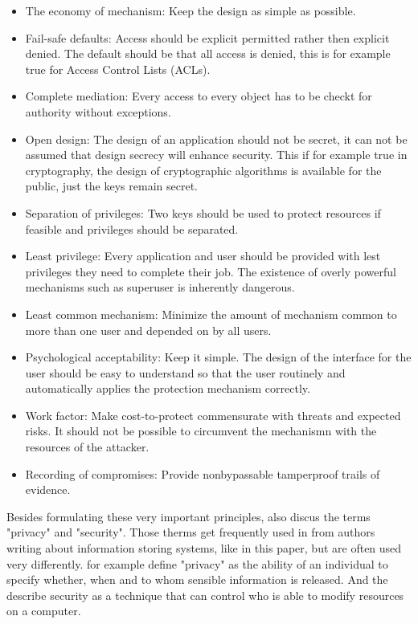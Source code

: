 \begin{itemize}
	\item The economy of mechanism: Keep the design as simple as possible.
	\item Fail-safe defaults: Access should be explicit permitted rather then explicit denied. The default should be that all access is denied, this is for example true for Access Control Lists (ACLs). 
	\item Complete mediation: Every access to every object has to be checkt for authority without exceptions. 
	\item Open design: The design of an application should not be secret, it can not be assumed that design secrecy will enhance security. This if for example true in cryptography, the design of cryptographic algorithms is available for the public, just the keys remain secret. 
	\item Separation of privileges: Two keys should be used to protect resources if feasible and privileges should be separated.  
	\item Least privilege: Every application and user should be provided with lest privileges they need to complete their job. The existence of overly powerful mechanisms such as superuser is inherently dangerous. 
	\item Least common mechanism: Minimize the amount of mechanism common to more than one user and depended on by all users.   
	\item Psychological acceptability: Keep it simple. The design of the interface for the user should be easy to understand so that the user routinely and automatically applies the protection mechanism correctly. 
	\item Work factor: Make cost-to-protect commensurate with threats and expected risks. It should not be possible to circumvent the mechanismn with the resources of the attacker.   
	\item Recording of compromises: Provide nonbypassable tamperproof trails of evidence.
\end{itemize}
	
Besides formulating these very important principles, \cite{Saltzer:PICS} also discus the terms "privacy" and "security". Those therms get frequently used in from authors writing about information storing systems, like in this paper, but are often used very differently. \cite{Saltzer:PICS} for example define "privacy" as the ability of an individual to specify whether, when and to whom sensible information is released. And the describe security as a technique that can control who is able to modify resources on a computer. 

